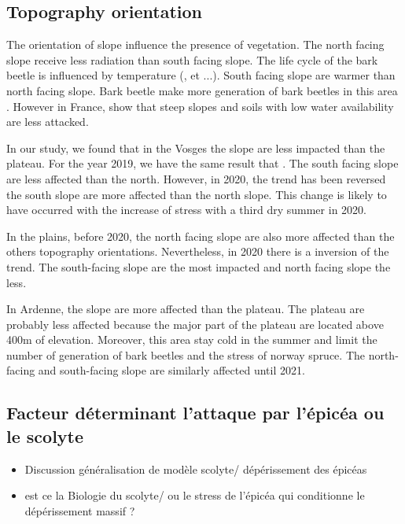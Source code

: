 \documentclass[3p,procedia]{elsarticle}
\begin{document}
{\begin{itemize}
\end{itemize}

\subsection{Topography orientation}


The orientation of slope influence the presence of vegetation. The north facing slope receive less radiation than south facing slope. 
The life cycle of the bark beetle is influenced by temperature (\cite{baier_phenipscomprehensive_2007}, et ...). South facing slope are warmer than north facing slope.
Bark beetle make more generation of bark beetles in this area \cite{}. 
However in France, \cite{nardi_drought_2022} show that steep slopes and soils with low water availability are less attacked. 

In our study, we found that in the Vosges the slope are less impacted than the plateau. 
For the year 2019, we have the same result that \cite{nardi_drought_2022}. 
The south facing slope are less affected than the north. 
However, in 2020, the trend has been reversed the south slope are more affected than the north slope. 
This change is likely to have occurred with the increase of stress with a third dry summer in 2020.

In the plains, before 2020, the north facing slope are also more affected than the others topography orientations. 
Nevertheless, in 2020 there is a inversion of the trend. 
The south-facing slope are the most impacted and north facing slope the less.

In Ardenne, the slope are more affected than the plateau. The plateau are probably less affected because the major part of the plateau are located above 400m of elevation.
Moreover, this area stay cold in the summer and limit the number of generation of bark beetles and the stress of norway spruce.
The north-facing and south-facing slope are similarly affected until 2021. 


 
\iffalse
\subsection{Facteur déterminant l'attaque par l'épicéa ou le scolyte}

\begin{itemize}
	\item Discussion généralisation de modèle scolyte/ dépérissement des épicéas
    \item est ce la Biologie du scolyte/ ou le stress de l'épicéa qui conditionne le dépérissement massif ?
	

\end{itemize}}
\end{document}
